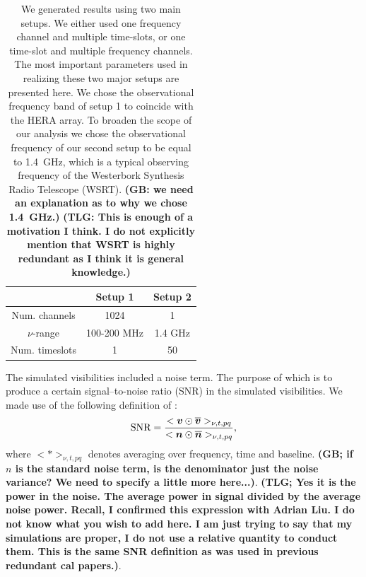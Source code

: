 \documentclass[useAMS,usenatbib]{mn2e}
\newcommand{\bz}{\bmath{z}}
\newcommand{\bv}{\bmath{v}}
\newcommand{\bn}{\bmath{n}}
\newcommand{\bone}{\bmath{1}}
\newcommand{\conj}[1]{\overline{#1}}
\begin{document}
\begin{table}
\centering
\caption{We generated results using two main setups. We either used one frequency channel and multiple time-slots, or one time-slot and multiple frequency channels. The most important parameters used in realizing these two major setups are presented here. %
We chose the observational frequency band of setup 1 to coincide with the HERA array. To broaden the scope of our 
analysis we chose the observational frequency of our second setup to be equal to 1.4~GHz, which is a typical observing frequency of the Westerbork Synthesis Radio Telescope (WSRT). 
{\bf (GB: we need an explanation as to why we chose 1.4~GHz.)}
{\bf (TLG: This is enough of a motivation I think. I do not explicitly mention that WSRT is highly redundant as I think it
is general knowledge.)}}
\begin{tabular}{|c c c|} 
\hline
 & Setup 1 & Setup 2\\
\hline
\hline
 Num. channels & 1024 & 1\\
$\nu$-range & 100-200 MHz & 1.4 GHz\\
Num. timeslots & 1 & 50\\
\hline
\end{tabular}
\label{tab:ch_parm}
\end{table}

The simulated visibilities included a noise term. The purpose of which is to produce a certain signal--to-noise ratio (SNR) in the simulated
visibilities. We made use of the following definition of \citep[SNR, ][]{Liu2010,Marthi2014}:  
\begin{equation}
\label{}
\textrm{SNR} = \frac{<\bv\odot\conj{\bv}>_{\nu,t,pq}}{<\bn\odot\conj{\bn}>_{\nu,t,pq}}, 
\end{equation}
where $<*>_{\nu,t,pq}$ denotes averaging over frequency, time and baseline.
{\bf (GB; if $n$ is the standard noise term, is the denominator just the noise variance? We need to specify a little more here...)}.
{\bf (TLG; Yes it is the power in the noise. The average power in signal divided by the average noise power. Recall, I confirmed this 
expression with Adrian Liu. I do not know what you wish to add here. I am just trying to say that my simulations are proper, I do not use a relative quantity to 
conduct them. This is the same SNR definition as was used in previous redundant cal papers.)}.
\end{document}
